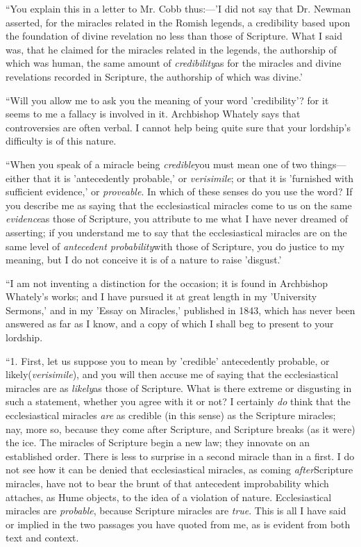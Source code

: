 ``You explain this in a letter to Mr. Cobb
thus:—'I did not say that Dr. Newman asserted, for
the miracles related in the Romish legends, a credibility
based upon the foundation of divine revelation no less
than those of Scripture. What I said was, that he claimed
for the miracles related in the legends, the authorship
of which was human, the same amount of \emph{credibility}as
for the miracles and divine revelations recorded in
Scripture, the authorship of which was divine.'


``Will you allow me to ask you the meaning of your
word 'credibility'? for it seems to me a fallacy is
involved in it. Archbishop Whately says that
controversies are often verbal. I cannot help being quite
sure that your lordship's difficulty is of this nature.


``When you speak of a miracle being \emph{credible}you
must mean one of two things—either that it is
'antecedently probable,' or \emph{verisimile}; or that it
is 'furnished with sufficient evidence,' or \emph{proveable}. In
which of these senses do you use the word? If you
describe me as saying that the ecclesiastical miracles
come to us on the same \emph{evidence}as those of
Scripture, you attribute to me what I have never dreamed
of asserting; if you understand me to say that the
ecclesiastical miracles are on the same level of \emph{antecedent
probability}with those of Scripture, you do justice
to my meaning, but I do not conceive it is of a nature to
raise 'disgust.'


``I am not inventing a distinction for the
occasion; it is found in Archbishop Whately's works; and
I have pursued it at great length in my 'University
Sermons,' and in my 'Essay on Miracles,' published in 1843, which has never been answered as far as I know, and
a copy of which I shall beg to present to your lordship.


``1. First, let us suppose you to mean by
'credible' antecedently probable, or likely\emph{}(\emph{verisimile}), and you will then accuse me of saying
that the ecclesiastical miracles are as \emph{likely}as
those of Scripture. What is there extreme or disgusting
in such a statement, whether you agree with it or not? I
certainly \emph{do} think that the ecclesiastical
miracles \emph{are} as credible (in this sense) as the
Scripture miracles; nay, more so, because they come after
Scripture, and Scripture breaks (as it were) the ice. The
miracles of Scripture begin a new law; they innovate on
an established order. There is less to surprise in a
second miracle than in a first. I do not see how it can
be denied that ecclesiastical miracles, as coming \emph{after}Scripture miracles, have not to bear the brunt of
that antecedent improbability which attaches, as Hume
objects, to the idea of a violation of nature.
Ecclesiastical miracles are \emph{probable}, because
Scripture miracles are \emph{true}. This is all I have
said or implied in the two passages you have quoted from
me, as is evident from both text and context.


